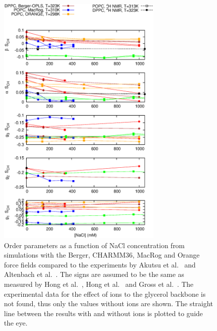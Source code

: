 \documentclass[pre,aps,floatfix,authordate1-4,twocolumn]{revtex4-1}
\begin{document}
\begin{figure}[]
  \centering
  \includegraphics[width=8cm]{../Fig/OrderParameterIONSnaclSIGN.eps}
  \caption{\label{ordPnacl}
    Order parameters as a function of NaCl concentration from simulations 
     with the Berger, CHARMM36, MacRog and Orange force fields compared to the experiments
     by Akutsu et al.~\cite{akutsu81} and Altenbach et al.~\cite{altenbach84}. The signs are assumed to be the same as measured by Hong et al.~\cite{hong95a}, Hong et al.~\cite{hong95b} and Gross et al.~\cite{gross97}. 
     The experimental data for the effect of ions to the glycerol backbone is not found, thus only the values without ions are shown. 
     The straight line between the results with and without ions is plotted to guide the eye. 
   }
\end{figure}
\end{document}
